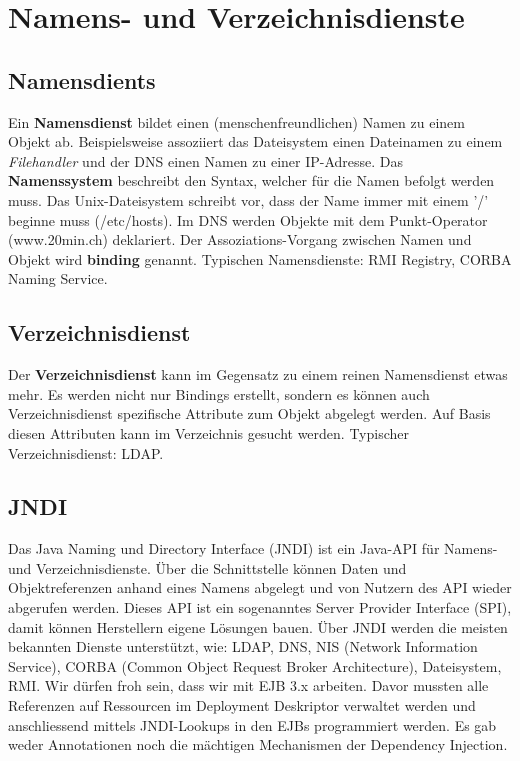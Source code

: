 \chapter{Namens- und Verzeichnisdienste}

\section{Namensdients}
Ein \textbf{Namensdienst} bildet einen (menschenfreundlichen) Namen zu einem Objekt ab. Beispielsweise assoziiert das Dateisystem einen Dateinamen zu einem \emph{Filehandler} und der DNS einen Namen zu einer IP-Adresse. Das \textbf{Namenssystem} beschreibt den Syntax, welcher für die Namen befolgt werden muss. Das Unix-Dateisystem schreibt vor, dass der Name immer mit einem '/' beginne muss (/etc/hosts). Im DNS werden Objekte mit dem Punkt-Operator (www.20min.ch) deklariert. Der Assoziations-Vorgang zwischen Namen und Objekt wird \textbf{binding} genannt. Typischen Namensdienste: RMI Registry, CORBA Naming Service.

\section{Verzeichnisdienst}
Der \textbf{Verzeichnisdienst} kann im Gegensatz zu einem reinen Namensdienst etwas mehr. Es werden nicht nur Bindings erstellt, sondern es können auch Verzeichnisdienst spezifische Attribute zum Objekt abgelegt werden. Auf Basis diesen Attributen kann im Verzeichnis gesucht werden. Typischer Verzeichnisdienst: LDAP.

\section{JNDI}
Das Java Naming und Directory Interface (JNDI) ist ein Java-API für Namens- und Verzeichnisdienste. Über die Schnittstelle können Daten und Objektreferenzen anhand eines Namens abgelegt und von Nutzern des API wieder abgerufen werden. Dieses API ist ein sogenanntes Server Provider Interface (SPI), damit können Herstellern eigene Lösungen bauen. Über JNDI werden die meisten bekannten Dienste unterstützt, wie: LDAP, DNS, NIS (Network Information Service), CORBA (Common Object Request Broker Architecture), Dateisystem, RMI. Wir dürfen froh sein, dass wir mit EJB 3.x arbeiten. Davor mussten alle Referenzen auf Ressourcen im Deployment Deskriptor verwaltet werden und anschliessend mittels JNDI-Lookups in den EJBs programmiert werden. Es gab weder Annotationen noch die mächtigen Mechanismen der Dependency Injection.

